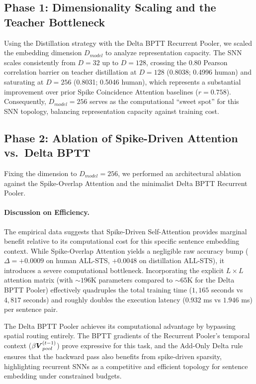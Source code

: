 \documentclass[runningheads]{llncs}
\begin{document}
\subsection{Phase 1: Dimensionality Scaling and the Teacher Bottleneck}
Using the Distillation strategy with the Delta BPTT Recurrent Pooler, we scaled the embedding dimension $D_{model}$ to analyze representation capacity. The SNN scales consistently from $D=32$ up to $D=128$, crossing the 0.80 Pearson correlation barrier on teacher distillation at $D=128$ (0.8038; 0.4996 human) and saturating at $D=256$ (0.8031; 0.5046 human), which represents a substantial improvement over prior Spike Coincidence Attention baselines \cite{coincidence2026} ($r=0.758$). Consequently, $D_{model} = 256$ serves as the computational ``sweet spot'' for this SNN topology, balancing representation capacity against training cost.

\subsection{Phase 2: Ablation of Spike-Driven Attention vs.\ Delta BPTT}
Fixing the dimension to $D_{model} = 256$, we performed an architectural ablation against the Spike-Overlap Attention and the minimalist Delta BPTT Recurrent Pooler.

\paragraph{Discussion on Efficiency.} The empirical data suggests that Spike-Driven Self-Attention provides marginal benefit relative to its computational cost for this specific sentence embedding context. While Spike-Overlap Attention yields a negligible raw accuracy bump ($\Delta = +0.0009$ on human ALL-STS, $+0.0048$ on distillation ALL-STS), it introduces a severe computational bottleneck. Incorporating the explicit $L \times L$ attention matrix (with $\sim 196$K parameters compared to $\sim 65$K for the Delta BPTT Pooler) effectively quadruples the total training time ($1{,}165$ seconds vs $4{,}817$ seconds) and roughly doubles the execution latency ($0.932$ ms vs $1.946$ ms) per sentence pair.

The Delta BPTT Pooler achieves its computational advantage by bypassing spatial routing entirely. The BPTT gradients of the Recurrent Pooler's temporal context ($\beta \boldsymbol{V}_{pool}^{(t-1)}$) prove expressive for this task, and the Add-Only Delta rule ensures that the backward pass also benefits from spike-driven sparsity, highlighting recurrent SNNs as a competitive and efficient topology for sentence embedding under constrained budgets.
\end{document}
